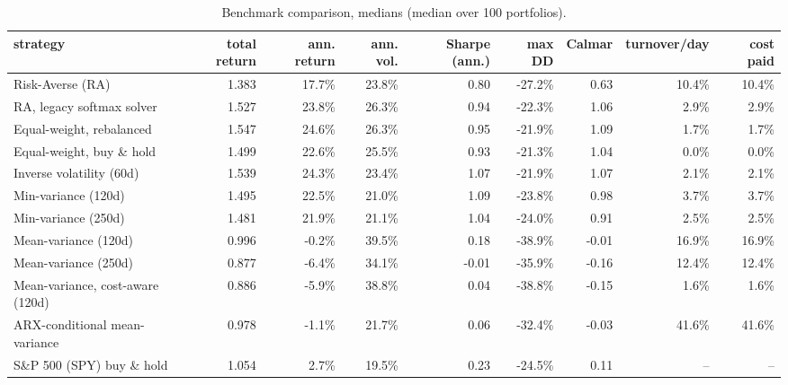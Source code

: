 \begin{table}[ht!]
\centering
\footnotesize
\setlength{\tabcolsep}{4pt}
\begin{tabular}{lrrrrrrrr}
\hline
strategy & total return & ann. return & ann. vol. & Sharpe (ann.) & max DD & Calmar & turnover/day & cost paid \\
\hline
Risk-Averse (RA) & 1.383 & 17.7\% & 23.8\% & 0.80 & -27.2\% & 0.63 & 10.4\% & 10.4\% \\
RA, legacy softmax solver & 1.527 & 23.8\% & 26.3\% & 0.94 & -22.3\% & 1.06 & 2.9\% & 2.9\% \\
Equal-weight, rebalanced & 1.547 & 24.6\% & 26.3\% & 0.95 & -21.9\% & 1.09 & 1.7\% & 1.7\% \\
Equal-weight, buy \& hold & 1.499 & 22.6\% & 25.5\% & 0.93 & -21.3\% & 1.04 & 0.0\% & 0.0\% \\
Inverse volatility (60d) & 1.539 & 24.3\% & 23.4\% & 1.07 & -21.9\% & 1.07 & 2.1\% & 2.1\% \\
Min-variance (120d) & 1.495 & 22.5\% & 21.0\% & 1.09 & -23.8\% & 0.98 & 3.7\% & 3.7\% \\
Min-variance (250d) & 1.481 & 21.9\% & 21.1\% & 1.04 & -24.0\% & 0.91 & 2.5\% & 2.5\% \\
Mean-variance (120d) & 0.996 & -0.2\% & 39.5\% & 0.18 & -38.9\% & -0.01 & 16.9\% & 16.9\% \\
Mean-variance (250d) & 0.877 & -6.4\% & 34.1\% & -0.01 & -35.9\% & -0.16 & 12.4\% & 12.4\% \\
Mean-variance, cost-aware (120d) & 0.886 & -5.9\% & 38.8\% & 0.04 & -38.8\% & -0.15 & 1.6\% & 1.6\% \\
ARX-conditional mean-variance & 0.978 & -1.1\% & 21.7\% & 0.06 & -32.4\% & -0.03 & 41.6\% & 41.6\% \\
S\&P 500 (SPY) buy \& hold & 1.054 & 2.7\% & 19.5\% & 0.23 & -24.5\% & 0.11 & -- & -- \\
\hline
\end{tabular}
\caption{Benchmark comparison, medians (median over 100 portfolios).}
\label{tab:bench_median_bear2022}
\end{table}
